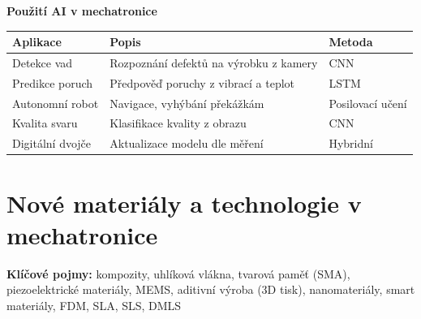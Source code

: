 \documentclass[a4paper,10pt]{article}
\begin{document}
\begin{vysvetlenibox}
\textbf{Použití AI v mechatronice}

\begin{center}
\begin{tabularx}{0.95\linewidth}{@{} l X l @{}}
    \toprule
    \textbf{Aplikace} & \textbf{Popis} & \textbf{Metoda} \\
    \midrule
    Detekce vad    & Rozpoznání defektů na výrobku z kamery & CNN \\
    Predikce poruch & Předpověď poruchy z vibrací a teplot & LSTM \\
    Autonomní robot & Navigace, vyhýbání překážkám & Posilovací učení \\
    Kvalita svaru  & Klasifikace kvality z obrazu & CNN \\
    Digitální dvojče & Aktualizace modelu dle měření & Hybridní \\
    \bottomrule
\end{tabularx}
\end{center}
\end{vysvetlenibox}

\section{Nové materiály a technologie v mechatronice}

\begin{pojmybox}
\textbf{Klíčové pojmy:}
kompozity, uhlíková vlákna, tvarová paměť (SMA), piezoelektrické materiály,
MEMS, aditivní výroba (3D tisk), nanomateriály, smart materiály,
FDM, SLA, SLS, DMLS
\end{pojmybox}
\end{document}
